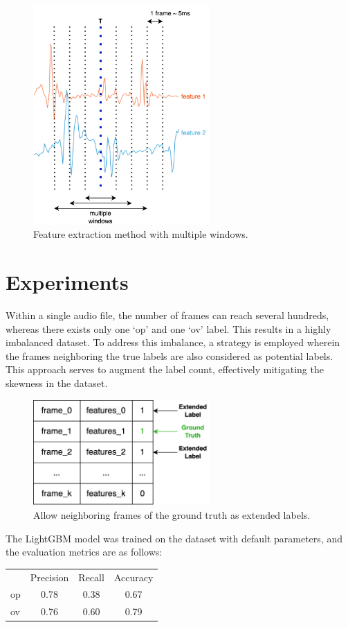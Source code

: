 \documentclass{article}
\begin{document}
\begin{figure}[H]
    \centering
    \includegraphics[width=0.6\textwidth]{img/features.png}
    \caption{Feature extraction method with multiple windows.}
\end{figure}
\section{Experiments}
Within a single audio file, the number of frames can reach several hundreds, whereas there exists only one `op' and one `ov' label. This results in a highly imbalanced dataset. To address this imbalance, a strategy is employed wherein the frames neighboring the true labels are also considered as potential labels. This approach serves to augment the label count, effectively mitigating the skewness in the dataset.
\begin{figure}[H]
    \centering
    \includegraphics[width=0.6\textwidth]{img/training.png}
    \caption{Allow neighboring frames of the ground truth as extended labels.}
\end{figure}
The LightGBM model was trained on the dataset with default parameters, and the evaluation metrics are as follows:
\begin{table}[h]
    \centering
    \begin{tabular}{l c c c}
    \midrule
    & Precision & Recall & Accuracy \\
    op & 0.78 & 0.38 & 0.67 \\
    ov & 0.76 & 0.60 & 0.79 \\
    \midrule
    \end{tabular}
\end{table}
\end{document}
